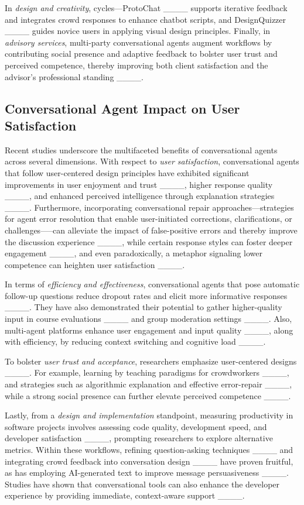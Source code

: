 In \textit{design and creativity}, cycles—ProtoChat ____ supports iterative feedback and integrates crowd responses to enhance chatbot scripts, and DesignQuizzer ____ guides novice users in applying visual design principles. Finally, in \textit{advisory services}, multi-party conversational agents augment workflows by contributing social presence and adaptive feedback to bolster user trust and perceived competence, thereby improving both client satisfaction and the advisor's professional standing ____.

\subsection{Conversational Agent Impact on User Satisfaction}
Recent studies underscore the multifaceted benefits of conversational agents across several dimensions. With respect to \textit{user satisfaction}, conversational agents that follow user-centered design principles have exhibited significant improvements in user enjoyment and trust ____, higher response quality ____, and enhanced perceived intelligence through explanation strategies ____. Furthermore, incorporating conversational repair approaches---strategies for agent error resolution that enable user-initiated corrections, clarifications, or challenges—--can alleviate the impact of false-positive errors and thereby improve the discussion experience ____, while certain response styles can foster deeper engagement ____, and even paradoxically, a metaphor signaling lower competence can heighten user satisfaction ____. 

In terms of \textit{efficiency and effectiveness}, conversational agents that pose automatic follow-up questions reduce dropout rates and elicit more informative responses ____. They have also demonstrated their potential to gather higher-quality input in course evaluations ____ and group moderation settings ____. Also, multi-agent platforms enhance user engagement and input quality ____, along with efficiency, by reducing context switching and cognitive load ____. 

To bolster \textit{user trust and acceptance}, researchers emphasize user-centered designs ____. For example, learning by teaching paradigms for crowdworkers ____, and strategies such as algorithmic explanation and effective error-repair ____, while a strong social presence can further elevate perceived competence ____. 

Lastly, from a \textit{design and implementation} standpoint, measuring productivity in software projects involves assessing code quality, development speed, and developer satisfaction ____, prompting researchers to explore alternative metrics. Within these workflows, refining question-asking techniques ____ and integrating crowd feedback into conversation design ____ have proven fruitful, as has employing AI-generated text to improve message persuasiveness ____. Studies have shown that conversational tools can also enhance the developer experience by providing immediate, context-aware support ____. 

